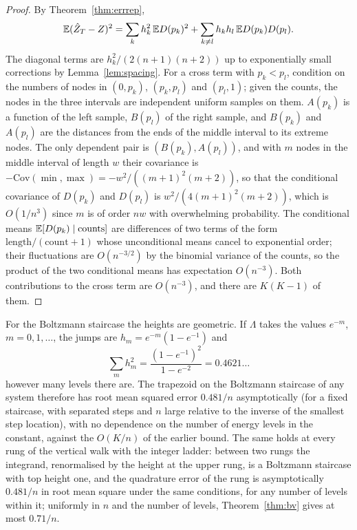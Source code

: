 \begin{proof}
By Theorem~\ref{thm:errrep},
\[
\mathbb{E}(\hat Z_T - Z)^2 = \sum_k h_k^2 \, \mathbb{E} D(p_k)^2 + \sum_{k \ne l} h_k h_l \, \mathbb{E} D(p_k) D(p_l) .
\]
The diagonal terms are $h_k^2 / (2(n+1)(n+2))$ up to exponentially small corrections by Lemma~\ref{lem:spacing}. For a cross term with $p_k < p_l$, condition on the numbers of nodes in $(0, p_k)$, $(p_k, p_l)$ and $(p_l, 1)$; given the counts, the nodes in the three intervals are independent uniform samples on them. $A(p_k)$ is a function of the left sample, $B(p_l)$ of the right sample, and $B(p_k)$ and $A(p_l)$ are the distances from the ends of the middle interval to its extreme nodes. The only dependent pair is $(B(p_k), A(p_l))$, and with $m$ nodes in the middle interval of length $w$ their covariance is $- \mathrm{Cov}(\min, \max) = - w^2 / ((m+1)^2 (m+2))$, so that the conditional covariance of $D(p_k)$ and $D(p_l)$ is $w^2 / (4 (m+1)^2 (m+2))$, which is $O(1 / n^3)$ since $m$ is of order $n w$ with overwhelming probability. The conditional means $\mathbb{E}[D(p_k) \mid \text{counts}]$ are differences of two terms of the form $\text{length} / (\text{count} + 1)$ whose unconditional means cancel to exponential order; their fluctuations are $O(n^{-3/2})$ by the binomial variance of the counts, so the product of the two conditional means has expectation $O(n^{-3})$. Both contributions to the cross term are $O(n^{-3})$, and there are $K(K-1)$ of them.
\end{proof}

For the Boltzmann staircase the heights are geometric. If $\Lambda$ takes the values $e^{-m}$, $m = 0, 1, \dots$, the jumps are $h_m = e^{-m} (1 - e^{-1})$ and
\[
\sum_m h_m^2 = \frac{ (1 - e^{-1})^2 }{ 1 - e^{-2} } = 0.4621 \ldots
\]
however many levels there are. The trapezoid on the Boltzmann staircase of any system therefore has root mean squared error $0.481 / n$ asymptotically (for a fixed staircase, with separated steps and $n$ large relative to the inverse of the smallest step location), with no dependence on the number of energy levels in the constant, against the $O(K/n)$ of the earlier bound. The same holds at every rung of the vertical walk with the integer ladder: between two rungs the integrand, renormalised by the height at the upper rung, is a Boltzmann staircase with top height one, and the quadrature error of the rung is asymptotically $0.481 / n$ in root mean square under the same conditions, for any number of levels within it; uniformly in $n$ and the number of levels, Theorem~\ref{thm:bv} gives at most $0.71 / n$.

